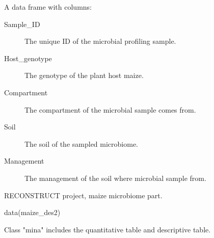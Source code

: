 \documentclass[a4paper]{book}
\begin{document}
%
\begin{Format}
A data frame with columns:
\begin{description}

\item[Sample\_ID] The unique ID of the microbial profiling sample.
\item[Host\_genotype] The genotype of the plant host maize.
\item[Compartment] The compartment of the microbial sample comes from.
\item[Soil] The soil of the sampled microbiome.
\item[Management] The management of the soil where microbial sample from.

\end{description}

\end{Format}
%
\begin{Source}\relax
RECONSTRUCT project, maize microbiome part.
\end{Source}
%
\begin{Examples}
\begin{ExampleCode}
data(maize_des2)

\end{ExampleCode}
\end{Examples}
%
\begin{Description}\relax
Class "mina" includes the quantitative table and descriptive table.
\end{Description}
%
\end{document}
